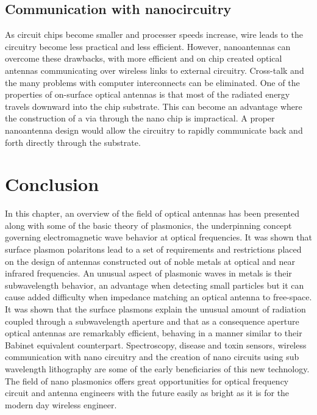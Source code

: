 \documentclass[11pt]{article}
\begin{document}
\subsection{Communication with nanocircuitry}
%
As circuit chips become smaller and processer speeds increase, wire leads to the circuitry become less practical and less efficient. However, nanoantennas can overcome these drawbacks, with more efficient and on chip created optical antennas communicating over wireless links to external circuitry. Cross-talk and the many problems with computer interconnects can be eliminated. One of the properties of on-surface optical antennas is that most of the radiated energy travels downward into the chip substrate. This can become an advantage where the construction of a via through the nano chip is impractical.  A proper nanoantenna design would allow the circuitry to rapidly communicate back and forth directly through the substrate.
\section{Conclusion}
%
In this chapter, an overview of the field of optical antennas has been presented along with some of the basic theory of plasmonics, the underpinning concept governing electromagnetic wave behavior at optical frequencies. It was shown that surface plasmon polaritons lead to a set of requirements and restrictions placed on the design of antennas constructed out of noble metals at optical and near infrared frequencies. An unusual aspect of plasmonic waves in metals is their subwavelength behavior, an advantage when detecting small particles but it can cause added difficulty when impedance matching an optical antenna to free-space. It was shown that the surface plasmons explain the unusual amount of radiation coupled through a subwavelength aperture and that as a consequence aperture optical antennas are remarkably efficient, behaving in a manner similar to their Babinet equivalent counterpart. Spectroscopy, disease and toxin sensors, wireless communication with nano circuitry and the creation of nano circuits using sub wavelength lithography are some of the early beneficiaries of this new technology. The field of nano plasmonics offers great opportunities for optical frequency circuit and antenna engineers with the future easily as bright as it is for the modern day wireless engineer.
%
\clearpage %
% 


\end{document}
